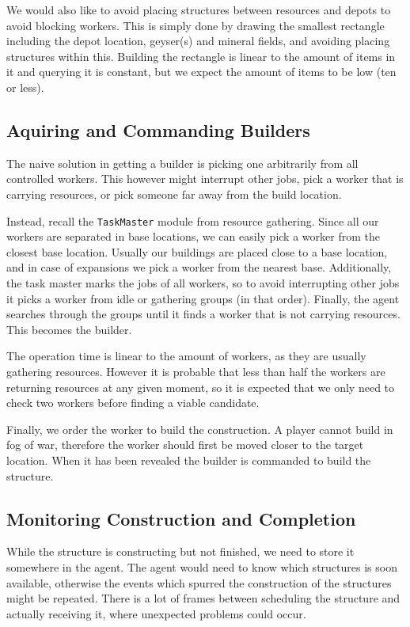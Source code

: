 		We would also like to avoid placing structures between resources and depots to avoid blocking workers. This is simply done by drawing the smallest rectangle including the depot location, geyser(s) and mineral fields, and avoiding placing structures within this. Building the rectangle is linear to the amount of items in it and querying it is constant, but we expect the amount of items to be low (ten or less).

	\subsection*{Aquiring and Commanding Builders}
	The naive solution in getting a builder is picking one arbitrarily from all controlled workers. This however might interrupt other jobs, pick a worker that is carrying resources, or pick someone far away from the build location.
	
	Instead, recall the \texttt{TaskMaster} module from resource gathering. Since all our workers are separated in base locations, we can easily pick a worker from the closest base location. Usually our buildings are placed close to a base location, and in case of expansions we pick a worker from the nearest base. Additionally, the task master marks the jobs of all workers, so to avoid interrupting other jobs it picks a worker from idle or gathering groups (in that order). Finally, the agent searches through the groups until it finds a worker that is not carrying resources. This becomes the builder.
	
	The operation time is linear to the amount of workers, as they are usually gathering resources. However it is probable that less than half the workers are returning resources at any given moment, so it is expected that we only need to check two workers before finding a viable candidate.
	
	Finally, we order the worker to build the construction. A player cannot build in fog of war, therefore the worker should first be moved closer to the target location. When it has been revealed the builder is commanded to build the structure.
	
	\subsection*{Monitoring Construction and Completion}
	While the structure is constructing but not finished, we need to store it somewhere in the agent. The agent would need to know which structures is soon available, otherwise the events which spurred the construction of the structures might be repeated. There is a lot of frames between scheduling the structure and actually receiving it, where unexpected problems could occur.
	
